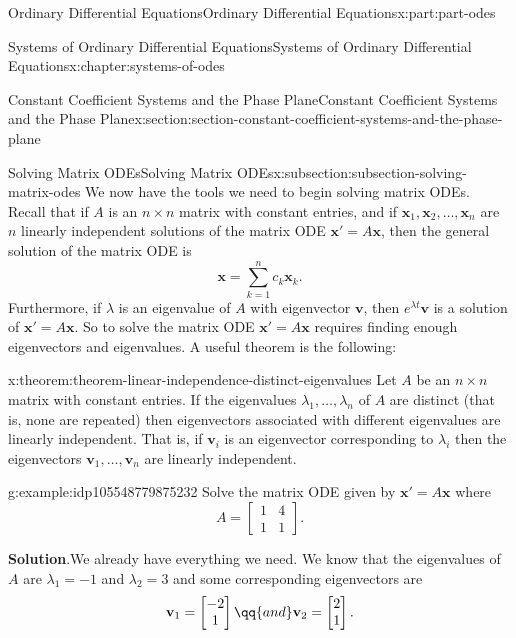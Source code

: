 \documentclass[oneside,10pt,]{book}
\newcommand{\blocktitlefont}{\relax}
\numberwithin{equation}{part}
\renewcommand{\vec}[1]{\mathbf{#1}}
\newcommand{\amp}{&}
\begin{document}
\begin{partptx}{Ordinary Differential Equations}{}{Ordinary Differential Equations}{}{}{x:part:part-odes}
\begin{chapterptx}{Systems of Ordinary Differential Equations}{}{Systems of Ordinary Differential Equations}{}{}{x:chapter:systems-of-odes}
\begin{sectionptx}{Constant Coefficient Systems and the Phase Plane}{}{Constant Coefficient Systems and the Phase Plane}{}{}{x:section:section-constant-coefficient-systems-and-the-phase-plane}
\begin{subsectionptx}{Solving Matrix ODEs}{}{Solving Matrix ODEs}{}{}{x:subsection:subsection-solving-matrix-odes}
We now have the tools we need to begin solving matrix ODEs. Recall that if \(A\) is an \(n\times n\) matrix with constant entries, and if \(\vec{x}_{1},\vec{x}_{2},\ldots,\vec{x}_{n}\) are \(n\) linearly independent solutions of the matrix ODE \(\vec{x}'=A\vec{x}\), then the general solution of the matrix ODE is%
\begin{equation*}
\vec{x} = \sum_{k=1}^{n}c_{k}\vec{x}_{k}.
\end{equation*}
Furthermore, if \(\lambda\) is an eigenvalue of \(A\) with eigenvector \(\vec{v}\), then \(e^{\lambda t}\vec{v}\) is a solution of \(\vec{x}'=A\vec{x}\). So to solve the matrix ODE \(\vec{x}'=A\vec{x}\) requires finding enough eigenvectors and eigenvalues. A useful theorem is the following:%
\begin{theorem}{}{}{x:theorem:theorem-linear-independence-distinct-eigenvalues}%
Let \(A\) be an \(n\times n\) matrix with constant entries. If the eigenvalues \(\lambda_{1},\ldots,\lambda_{n}\) of \(A\) are distinct (that is, none are repeated) then eigenvectors associated with different eigenvalues are linearly independent. That is, if \(\vec{v}_{i}\) is an eigenvector corresponding to \(\lambda_{i}\) then the eigenvectors \(\vec{v}_{1},\ldots,\vec{v}_{n}\) are linearly independent.%
\end{theorem}
\begin{example}{}{g:example:idp105548779875232}%
Solve the matrix ODE given by \(\vec{x}' = A\vec{x}\) where%
\begin{equation*}
A = \begin{bmatrix}1\amp 4\\1\amp 1\end{bmatrix}.
\end{equation*}
%
\par\smallskip%
\noindent\textbf{\blocktitlefont Solution}.\hypertarget{g:solution:idp105548779876512}{}\quad{}We already have everything we need. We know that the eigenvalues of \(A\) are \(\lambda_{1}=-1\) and \(\lambda_{2}=3\) and some corresponding eigenvectors are%
\begin{equation*}
\vec{v}_{1} = \begin{bmatrix}-2\\1\end{bmatrix}\qq{and} \vec{v}_{2} = \begin{bmatrix}2\\1\end{bmatrix}.
\end{equation*}

\end{example}
\end{subsectionptx}
\end{sectionptx}
\end{chapterptx}
\end{partptx}
\end{document}
